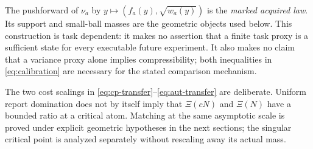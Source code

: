 The pushforward of $\nu_a$ by $y\mapsto(f_a(y),\sqrt{w_a(y)})$ is the \emph{marked acquired law}. Its support and small-ball masses are the geometric objects used below. This construction is task dependent: it makes no assertion that a finite task proxy is a sufficient state for every executable future experiment. It also makes no claim that a variance proxy alone implies compressibility; both inequalities in \eqref{eq:calibration} are necessary for the stated comparison mechanism.

The two cost scalings in \eqref{eq:cp-transfer}--\eqref{eq:aut-transfer} are deliberate. Uniform report domination does not by itself imply that $\Xi(cN)$ and $\Xi(N)$ have a bounded ratio at a critical atom. Matching at the same asymptotic scale is proved under explicit geometric hypotheses in the next sections; the singular critical point is analyzed separately without rescaling away its actual mass.
